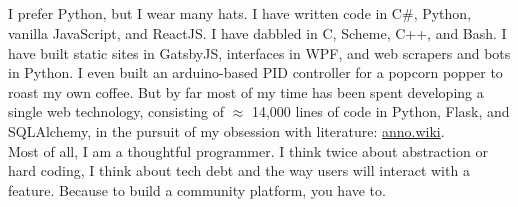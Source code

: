 \documentclass[9pt]{developercv} %
\begin{document}
\begin{minipage}[t]{0.275\textwidth} %
    \vspace{-\baselineskip} %

    \\
    \\
    \\
    \\
\end{minipage}




    I prefer Python, but I wear many hats. I have written code in C\#,
    Python, vanilla JavaScript, and ReactJS. I have dabbled in C, Scheme, C++,
    and Bash. I have built static sites in GatsbyJS, interfaces in WPF, and web
    scrapers and bots in Python. I even built an arduino-based PID controller
    for a popcorn popper to roast my own coffee. But by far most of my time has
    been spent developing a single web technology, consisting of $\approx$
    14,000 lines of code in Python, Flask, and SQLAlchemy, in the pursuit of my
    obsession with literature:
    {\href{https://github.com/malan88/icc}{anno.wiki}}.\\

    Most of all, I am a thoughtful programmer. I think twice about abstraction
    or hard coding, I think about tech debt and the way users will interact
    with a feature. Because to build a community platform, you have to.
\end{document}
